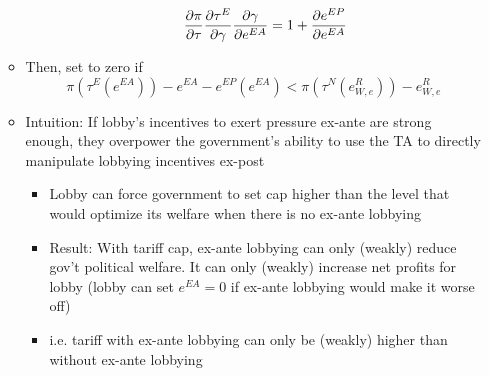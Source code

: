 \begin{itemize}
\begin{itemize}
\begin{itemize}
\begin{equation}
							  \frac{\partial \pi}{\partial \tau} \frac{\partial \tau^E}{\partial \gamma} \frac{\partial \gamma}{\partial e^{EA}} = 1 +\frac{\partial e^{EP}}{\partial e^{EA}}
								\label{eq:ea}
							\end{equation}
					\end{itemize}
			\item Then, set to zero if
			  \begin{equation}
				  \pi(\tau^E(e^{EA})) - e^{EA} - e^{EP}(e^{EA}) < \pi(\tau^N(e^R_{W,e})) - e^R_{W,e} 
					\label{ine:ea}
				\end{equation}
			\item Intuition: If lobby's incentives to exert pressure ex-ante are strong enough, they overpower the government's ability to use the TA to directly manipulate lobbying incentives ex-post
				\begin{itemize}
					\item Lobby can force government to set cap higher than the level that would optimize its welfare when there is no ex-ante lobbying
					\item Result: With tariff cap, ex-ante lobbying can only (weakly) reduce gov't political welfare. It can only (weakly) increase net profits for lobby (lobby can set $e^{EA}=0$ if ex-ante lobbying would make it worse off)
					\item i.e. tariff with ex-ante lobbying can only be (weakly) higher than without ex-ante lobbying
				\end{itemize}	
		\end{itemize}	
\end{itemize}	
				
